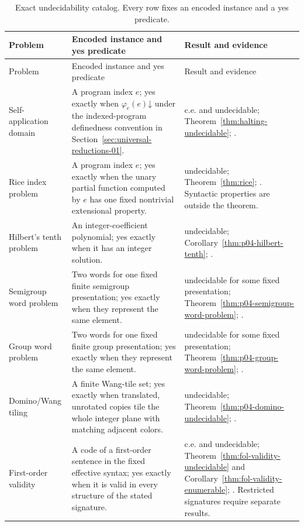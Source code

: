 \begingroup\small
\begin{longtable}{@{}p{}p{}p{}@{}}
\caption{Exact undecidability catalog.  Every row fixes an
encoded instance and a yes predicate.}
\label{tab:p04-undecidability-catalog}\\
\toprule
Problem & Encoded instance and yes predicate & Result and evidence \\
\midrule
\endfirsthead
\toprule
Problem & Encoded instance and yes predicate & Result and evidence \\
\midrule
\endhead
\bottomrule
\endfoot
Self-application domain & A program index \(e\); yes exactly when
\(\varphi_e(e)\mathord\downarrow\) under
the indexed-program definedness convention in
Section~\ref{sec:universal-reductions-01}. & c.e. and undecidable;
Theorem~\ref{thm:halting-undecidable}; \cite{Turing1937}. \\
\addlinespace
Rice index problem & A program index \(e\); yes exactly when the unary
partial function computed by \(e\) has one fixed nontrivial extensional
property. & undecidable; Theorem~\ref{thm:rice}; \cite{Rice1953}.
Syntactic properties are outside the theorem. \\
\addlinespace
Hilbert's tenth problem & An integer-coefficient polynomial; yes exactly when
it has an integer solution. & undecidable;
Corollary~\ref{thm:p04-hilbert-tenth};
\cite{DavisPutnamRobinson1961,Matiyasevich1970,Davis1973}. \\
\addlinespace
Semigroup word problem & Two words for one fixed finite semigroup
presentation; yes exactly when they represent the same element. & undecidable
for some fixed presentation; Theorem~\ref{thm:p04-semigroup-word-problem};
\cite{Post1947,Markov1947}. \\
\addlinespace
Group word problem & Two words for one fixed finite group presentation; yes
exactly when they represent the same element. & undecidable for some fixed
presentation; Theorem~\ref{thm:p04-group-word-problem};
\cite{Novikov1955,Boone1958,Boone1959}. \\
\addlinespace
Domino/Wang tiling & A finite Wang-tile set; yes exactly when translated,
unrotated copies tile the whole integer plane with matching adjacent colors. &
undecidable; Theorem~\ref{thm:p04-domino-undecidable};
\cite{Berger1966,Wang1961PatternII}. \\
\addlinespace
First-order validity & A code of a first-order sentence in the fixed effective
syntax; yes exactly when it is valid in every structure of the stated
signature. & c.e. and undecidable;
Theorem~\ref{thm:fol-validity-undecidable} and
Corollary~\ref{thm:fol-validity-enumerable};
\cite{Church1936,Turing1937}.  Restricted
signatures require separate results. \\
\end{longtable}
\endgroup

